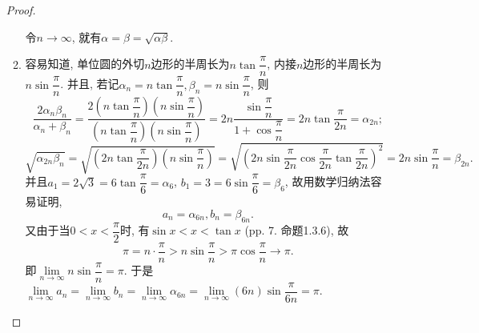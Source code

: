 \documentclass[a4paper,11pt,twoside]{ctexbook}
\begin{document}
\begin{enumerate}
\begin{proof}
\begin{enumerate}[(1)]
\[			            \]
			            令$n\to\infty$, 就有$\alpha=\beta=\sqrt{\alpha\beta}$.
			      \item 容易知道, 单位圆的外切$n$边形的半周长为$n\tan{\dfrac{\pi}{n}}$, 内接$n$边形的半周长为$n\sin{\dfrac{\pi}{n}}$. 并且, 若记$\alpha_n=n\tan{\dfrac{\pi}{n}}, \beta_n=n\sin{\dfrac{\pi}{n}}$, 则
			            \[
				            \dfrac{2\alpha_n\beta_n}{\alpha_n+\beta_n}=\dfrac{2\left(n\tan{\dfrac{\pi}{n}}\right)\left(n\sin{\dfrac{\pi}{n}}\right)}{\left(n\tan{\dfrac{\pi}{n}}\right)\left(n\sin{\dfrac{\pi}{n}}\right)}=2n\dfrac{\sin{\dfrac{\pi}{n}}}{1+\cos{\dfrac{\pi}{n}}}=2n\tan{\dfrac{\pi}{2n}}=\alpha_{2n};
			            \]
			            \[
				            \sqrt{\alpha_{2n}\beta_n}=\sqrt{\left(2n\tan{\dfrac{\pi}{2n}}\right)\left(n\sin{\dfrac{\pi}{n}}\right)}=\sqrt{\left(2n\sin{\dfrac{\pi}{2n}}\cos{\dfrac{\pi}{2n}}\tan{\dfrac{\pi}{2n}}\right)^2}=2n\sin{\dfrac{\pi}{n}}=\beta_{2n}.
			            \]
			            并且$a_1=2\sqrt{3}=6\tan{\dfrac{\pi}{6}}=\alpha_6$, $b_1=3=6\sin{\dfrac{\pi}{6}}=\beta_6$, 故用数学归纳法容易证明,
			            \[
				            a_n=\alpha_{6n}, b_n=\beta_{6n}.
			            \]
			            又由于当$0<x<\dfrac{\pi}{2}$时, 有$\sin{x}<x<\tan{x}$ (pp. 7. 命题1.3.6), 故
			            \[
				            \pi=n\cdot\dfrac{\pi}{n}>n\sin{\dfrac{\pi}{n}}>\pi\cos{\dfrac{\pi}{n}}\to\pi.
			            \]
			            即$\lim\limits_{n\to\infty} n\sin{\dfrac{\pi}{n}}=\pi$. 于是$\lim\limits_{n\to\infty} a_n=\lim\limits_{n\to\infty} b_n=\lim\limits_{n\to\infty} \alpha_{6n}=\lim\limits_{n\to\infty} (6n)\sin{\dfrac{\pi}{6n}}=\pi$. \qedhere
		      \end{enumerate}
	      \end{proof}
\end{enumerate}
\end{document}
